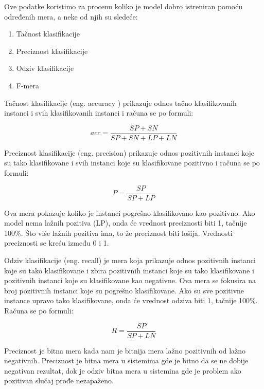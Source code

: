 \documentclass[12pt,oneside]{memoir}
\begin{document}
Ove podatke koristimo za procenu koliko je model dobro istreniran pomoću određenih mera, a neke od njih su sledeće:

\begin{enumerate}
\item Tačnost klasifikacije
\item Preciznost klasifikacije
\item Odziv klasifikacije
\item F-mera
\end{enumerate}

Tačnost klasifikacije (eng.  accuracy ) prikazuje odnos tačno klasifikovanih instanci i svih klasifikovanih instanci i računa se po formuli:

\begin{equation}
	acc = \frac{SP+SN}{SP+SN+LP+LN}
\end{equation}

Preciznost klasifikacije (eng. precision) prikazuje odnos pozitivnih instanci koje su tako klasifikovane i svih instanci koje su klasifikovane pozitivno i računa se po formuli:

\begin{equation}
	P = \frac{SP}{SP+LP}
\end{equation}

Ova mera pokazuje koliko je instanci pogrešno klasifikovano kao pozitivno.  Ako model nema lažnih pozitiva (LP),  onda će vrednost preciznosti biti 1, tačnije 100\%. Što više lažnih pozitiva ima, to že preciznost biti lošija. Vrednosti preciznosti se kreću između 0 i 1. 

Odziv klasifikacije (eng. recall) je mera koja prikazuje odnos pozitivnih instanci koje su tako klasifikovane i zbira pozitivnih instanci koje su tako klasifikovane i pozitivnih instanci koje su klasifikovane kao negativne.  Ova mera se fokusira na broj pozitivnih instanci koje su pogrešno klasifikovane. Ako su sve pozitivne instance upravo tako klasifikovane,  onda će vrednost odziva biti 1, tačnije 100\%. Računa se po formuli:

\begin{equation}
	R = \frac{SP}{SP+LN}
\end{equation}

Preciznost je bitna mera kada nam je bitnija mera lažno pozitivnih od lažno negativnih.  Preciznost je bitna mera u sistemima gde je bitno da se ne dobije negativan rezultat, dok je odziv bitna mera u sistemina gde je problem ako pozitivan slučaj prođe nezapaženo. 
\end{document}
